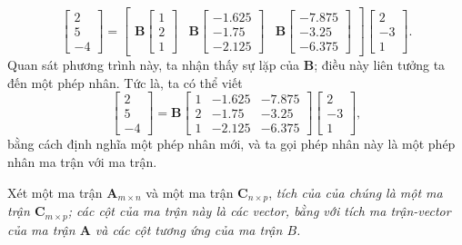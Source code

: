 \[\begin{bmatrix}
    2\\5\\-4
\end{bmatrix}=\begin{bmatrix}
    \mathbf{B}\begin{bmatrix}
        1\\2\\1
    \end{bmatrix}&\mathbf{B}\begin{bmatrix}
        -1.625\\-1.75\\-2.125
    \end{bmatrix}&\mathbf{B}\begin{bmatrix}
        -7.875\\-3.25\\-6.375
\end{bmatrix}\end{bmatrix}\begin{bmatrix}
2\\-3\\1
\end{bmatrix}.\] Quan sát phương trình này, ta nhận thấy sự lặp của \(\mathbf{B}\); điều này liên tưởng ta đến một phép nhân. 
Tức là, ta có thể viết 
\begin{equation}\begin{bmatrix}
    2\\5\\-4
\end{bmatrix}=\mathbf{B}\begin{bmatrix}
    1&-1.625&-7.875\\
    2&-1.75&-3.25\\
    1&-2.125&-6.375
\end{bmatrix}\begin{bmatrix}
    2\\-3\\1
\end{bmatrix},\end{equation}\label{eqmatrix} bằng cách định nghĩa một phép nhân mới, và ta gọi phép nhân này là một phép nhân ma trận với ma trận.
\vspace{8pt}

Xét một ma trận \(\mathbf{A}_{m\times n}\) và một ma trận \(\mathbf{C}_{n\times p}\), \emph{tích của của chúng là một ma trận \(\mathbf{C}_{m\times p}\); các cột của ma trận này là các vector, bằng với tích ma trận-vector của ma trận \(\mathbf{A}\) và các cột tương ứng  của ma trận \(B\).}
\vspace{8pt}


